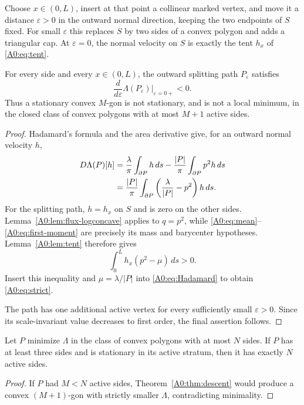 Choose \(x\in(0,L)\), insert at that point a collinear marked vertex, and
move it a distance \(\varepsilon>0\) in the outward normal direction,
keeping the two endpoints of \(S\) fixed.  For small \(\varepsilon\) this
replaces \(S\) by two sides of a convex polygon and adds a triangular cap.
At \(\varepsilon=0\), the normal velocity on \(S\) is exactly the tent
\(h_x\) of \eqref{A0:eq:tent}.

\begin{theorem}\label{A0:thm:descent}
For every side and every \(x\in(0,L)\), the outward splitting path
\(P_\varepsilon\) satisfies
\begin{equation}\label{A0:eq:strict}
 \boxed{
 \frac d{d\varepsilon}\Lambda(P_\varepsilon)
 \bigg|_{\varepsilon=0+}<0.}
\end{equation}
Thus a stationary convex \(M\)-gon is not stationary, and is not a local
minimum, in the closed class of convex polygons with at most \(M+1\)
active sides.
\end{theorem}

\begin{proof}
Hadamard's formula and the area derivative give, for an outward normal
velocity \(h\),
\begin{align}
 D\Lambda(P)[h]
 &=\frac{\lambda}{\pi}\int_{\partial P}h\,ds
   -\frac{|P|}{\pi}\int_{\partial P}p^2h\,ds\notag\\
 &=\frac{|P|}{\pi}\int_{\partial P}
   \left(\frac{\lambda}{|P|}-p^2\right)h\,ds.
 \label{A0:eq:Hadamard}
\end{align}
For the splitting path, \(h=h_x\) on \(S\) and is zero on the other
sides.  Lemma~\ref{A0:lem:flux-logconcave} applies to \(q=p^2\), while
\eqref{A0:eq:mean}--\eqref{A0:eq:first-moment} are precisely its mass and
barycenter hypotheses.  Lemma~\ref{A0:lem:tent} therefore gives
\[
 \int_0^Lh_x(p^2-\mu)\,ds>0.
\]
Insert this inequality and \(\mu=\lambda/|P|\) into
\eqref{A0:eq:Hadamard} to obtain \eqref{A0:eq:strict}.

The path has one additional active vertex for every sufficiently small
\(\varepsilon>0\).  Since its scale-invariant value decreases to first
order, the final assertion follows.
\end{proof}

\begin{corollary}\label{A0:cor:no-loss}
Let \(P\) minimize \(\Lambda\) in the class of convex polygons with at
most \(N\) sides.  If \(P\) has at least three sides and is stationary in
its active stratum, then it has exactly \(N\) active sides.
\end{corollary}

\begin{proof}
If \(P\) had \(M<N\) active sides, Theorem~\ref{A0:thm:descent} would produce
a convex \((M+1)\)-gon with strictly smaller \(\Lambda\), contradicting
minimality.
\end{proof}
\endgroup
